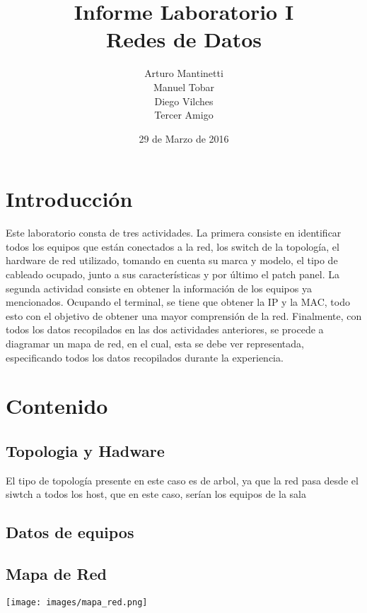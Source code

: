 \documentclass[spanish]{udpreport}
\title{Informe Laboratorio I \\ Redes de Datos}
\author{Arturo Mantinetti \\ Manuel Tobar \\ Diego Vilches \\ Tercer Amigo}
\date{29 de Marzo de 2016}
\begin{document}
\maketitle

\tableofcontents

\chapter{Introducción}

Este laboratorio consta de tres actividades. La primera consiste en identificar todos los equipos que están conectados a la red, los switch de la topología, el hardware de red utilizado, tomando en cuenta su marca y modelo, el tipo de cableado ocupado, junto a sus características y por último el patch panel. La segunda actividad consiste en obtener la información de los equipos ya mencionados. Ocupando el terminal, se tiene que obtener la IP y la MAC, todo esto con el objetivo de obtener una mayor comprensión de la red. Finalmente, con todos los datos recopilados en las dos actividades anteriores, se procede a diagramar un mapa de red, en el cual, esta se debe ver representada,  especificando todos los datos recopilados durante la experiencia.


\chapter{Contenido}

\section{Topologia y Hadware}
El tipo de topología presente en este caso es de arbol, ya que la red pasa desde el siwtch a todos los host, que en este caso, serían los equipos de la sala

\section{Datos de equipos}


\pagebreak
\section{Mapa de Red}

\begin{center}
	\texttt{[image: images/mapa\_red.png]} 
\end{center}

\listoffigures
\end{document}
